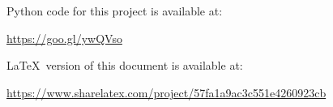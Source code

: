Python code for this project is available at:

\url{https://goo.gl/ywQVso}

\vspace{1cm}


\LaTeX\ version of this document is available at:

\url{https://www.sharelatex.com/project/57fa1a9ac3c551e4260923cb}

\vspace{1cm}